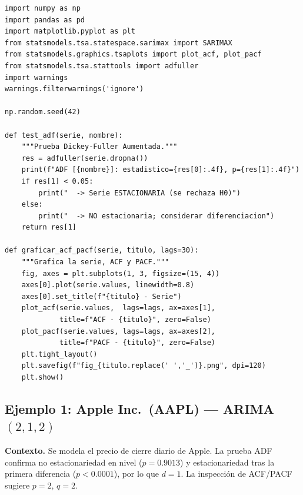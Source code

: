 \documentclass[12pt,a4paper]{article}
\begin{document}
\begin{lstlisting}[caption={Importaciones y funciones auxiliares comunes a los tres ejemplos}]
import numpy as np
import pandas as pd
import matplotlib.pyplot as plt
from statsmodels.tsa.statespace.sarimax import SARIMAX
from statsmodels.graphics.tsaplots import plot_acf, plot_pacf
from statsmodels.tsa.stattools import adfuller
import warnings
warnings.filterwarnings('ignore')

np.random.seed(42)

def test_adf(serie, nombre):
    """Prueba Dickey-Fuller Aumentada."""
    res = adfuller(serie.dropna())
    print(f"ADF [{nombre}]: estadistico={res[0]:.4f}, p={res[1]:.4f}")
    if res[1] < 0.05:
        print("  -> Serie ESTACIONARIA (se rechaza H0)")
    else:
        print("  -> NO estacionaria; considerar diferenciacion")
    return res[1]

def graficar_acf_pacf(serie, titulo, lags=30):
    """Grafica la serie, ACF y PACF."""
    fig, axes = plt.subplots(1, 3, figsize=(15, 4))
    axes[0].plot(serie.values, linewidth=0.8)
    axes[0].set_title(f"{titulo} - Serie")
    plot_acf(serie.values,  lags=lags, ax=axes[1],
             title=f"ACF - {titulo}", zero=False)
    plot_pacf(serie.values, lags=lags, ax=axes[2],
             title=f"PACF - {titulo}", zero=False)
    plt.tight_layout()
    plt.savefig(f"fig_{titulo.replace(' ','_')}.png", dpi=120)
    plt.show()
\end{lstlisting}

\subsection{Ejemplo 1: Apple Inc.\ (AAPL) --- ARIMA$(2,1,2)$}

\textbf{Contexto.} Se modela el precio de cierre diario de Apple. La prueba ADF
confirma no estacionariedad en nivel ($p = 0.9013$) y estacionariedad tras la primera
diferencia ($p < 0.0001$), por lo que $d=1$. La inspección de ACF/PACF sugiere $p=2$,
$q=2$.
\end{document}
